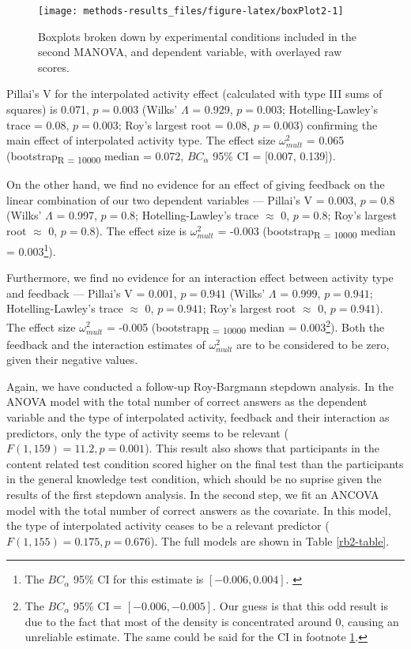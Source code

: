 \documentclass[11pt,]{article}
\let\rmarkdownfootnote\footnote%
\def\footnote{\protect\rmarkdownfootnote}
\begin{document}
\begin{figure*}[h]

{\centering \texttt{[image: methods-results\_files/figure-latex/boxPlot2-1]} 

}

\caption{\label{box2} Boxplots broken down by experimental conditions included in the second MANOVA, and dependent variable, with overlayed raw scores.}\label{fig:boxPlot2}
\end{figure*}

Pillai's V for the interpolated activity effect (calculated with type
III sums of squares) is 0.071, \(p = 0.003\) (Wilks' \(\Lambda\) =
0.929, \(p = 0.003\); Hotelling-Lawley's trace = 0.08, \(p = 0.003\);
Roy's largest root = 0.08, \(p = 0.003\)) confirming the main effect of
interpolated activity type. The effect size \(\omega^2_{mult}\) = 0.065
(bootstrap\textsubscript{R = 10000} median = 0.072, \(BC_\alpha\) 95\%
CI = {[}0.007, 0.139{]}).

On the other hand, we find no evidence for an effect of giving feedback
on the linear combination of our two dependent variables --- Pillai's V
= 0.003, \(p = 0.8\) (Wilks' \(\Lambda\) = 0.997, \(p = 0.8\);
Hotelling-Lawley's trace \(\approx\) 0, \(p = 0.8\); Roy's largest root
\(\approx\) 0, \(p = 0.8\)). The effect size is \(\omega^2_{mult}\) =
-0.003 (bootstrap\textsubscript{R = 10000} median = 0.003\footnote{
The \(BC_\alpha\) 95\% CI for this estimate is \([-0.006, 0.004]\).
\label{bca-ref}}).

Furthermore, we find no evidence for an interaction effect between
activity type and feedback --- Pillai's V = 0.001, \(p = 0.941\) (Wilks'
\(\Lambda\) = 0.999, \(p = 0.941\); Hotelling-Lawley's trace \(\approx\)
0, \(p = 0.941\); Roy's largest root \(\approx\) 0, \(p = 0.941\)). The
effect size \(\omega^2_{mult}\) = -0.005
(bootstrap\textsubscript{R = 10000} median = 0.003\footnote{
The \(BC_\alpha\) 95\% CI = \([-0.006, -0.005]\).
Our guess is that this odd result is due to the fact that most of the density is concentrated
around 0, causing an unreliable estimate. The same could be said for the CI in
footnote \ref{bca-ref}.}). Both the feedback and the interaction
estimates of \(\omega^2_{mult}\) are to be considered to be zero, given
their negative values.

Again, we have conducted a follow-up Roy-Bargmann stepdown analysis. In
the ANOVA model with the total number of correct answers as the
dependent variable and the type of interpolated activity, feedback and
their interaction as predictors, only the type of activity seems to be
relevant (\(F(1, 159) = 11.2, p = 0.001\)). This result also shows that
participants in the content related test condition scored higher on the
final test than the participants in the general knowledge test
condition, which should be no suprise given the results of the first
stepdown analysis. In the second step, we fit an ANCOVA model with the
total number of correct answers as the covariate. In this model, the
type of interpolated activity ceases to be a relevant predictor
(\(F(1, 155) = 0.175, p = 0.676\)). The full models are shown in Table
\ref{rb2-table}.
\end{document}
